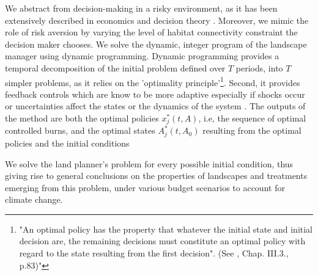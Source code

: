 We abstract from decision-making in a risky environment, as it has been extensively described in economics and decision theory \citep{Mouysset2013}. Moreover, we mimic the role of risk aversion by varying the level of habitat connectivity constraint the decision maker chooses. 
We solve the dynamic, integer program of the landscape manager using dynamic programming. Dynamic programming provides a temporal decomposition of the initial problem defined over $T$ periods, into $T$ simpler problems, as it relies on the 'optimality principle'\footnote{"An optimal policy has the property that whatever the initial state and initial decision are, the remaining decisions must constitute an optimal policy with regard to the state resulting from the first decision". (See \cite{Bellman}, Chap. III.3., p.83)"}. Second, it provides feedback controls which are know to be more adaptive especially if shocks occur or uncertainties affect the states or the dynamics of the system . The outputs of the method are both the optimal policies $x_j^*(t,A)$, i.e, the sequence of optimal controlled burns, and the optimal states $A_j^*(t,A_0)$ resulting from the optimal policies and the initial conditions

We solve the land planner's problem for every possible initial condition, thus giving rise to general conclusions on the properties of landscapes and treatments emerging from this problem, under various budget scenarios to account for climate change.


